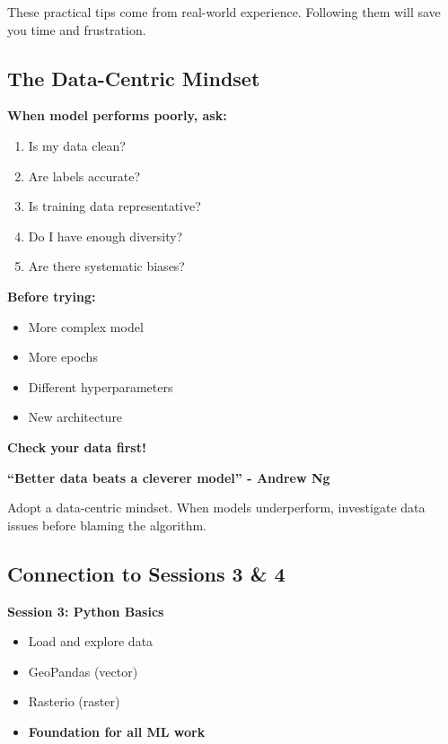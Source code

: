 \documentclass[
  letterpaper,
  DIV=11,
  numbers=noendperiod]{scrartcl}
\providecommand{\tightlist}{%
  \setlength{\itemsep}{0pt}\setlength{\parskip}{0pt}}
\begin{document}
These practical tips come from real-world experience. Following them
will save you time and frustration.

\subsection{The Data-Centric Mindset}\label{the-data-centric-mindset}

\textbf{When model performs poorly, ask:}

\begin{enumerate}
\def\labelenumi{\arabic{enumi}.}
\tightlist
\item
  Is my data clean?
\item
  Are labels accurate?
\item
  Is training data representative?
\item
  Do I have enough diversity?
\item
  Are there systematic biases?
\end{enumerate}

\textbf{Before trying:}

\begin{itemize}
\tightlist
\item
  More complex model
\item
  More epochs
\item
  Different hyperparameters
\item
  New architecture
\end{itemize}

\textbf{Check your data first!}

\textbf{``Better data beats a cleverer model'' - Andrew Ng}

Adopt a data-centric mindset. When models underperform, investigate data
issues before blaming the algorithm.

\subsection{Connection to Sessions 3 \&
4}\label{connection-to-sessions-3-4}

\textbf{Session 3: Python Basics}

\begin{itemize}
\tightlist
\item
  Load and explore data
\item
  GeoPandas (vector)
\item
  Rasterio (raster)
\item
  \textbf{Foundation for all ML work}
\end{itemize}
\end{document}
